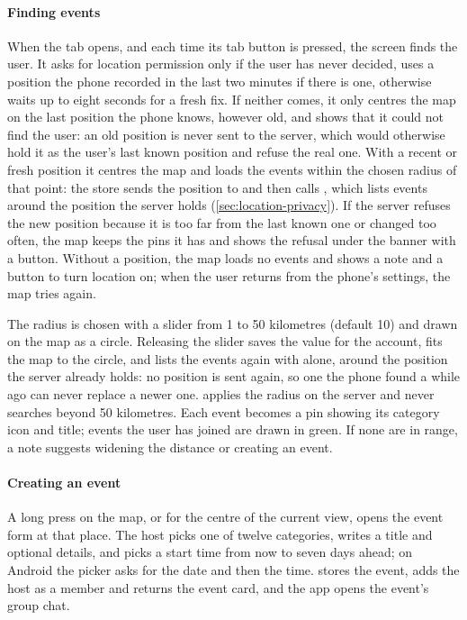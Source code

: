 \paragraph{Finding events} When the  tab opens, and each time its tab button is pressed, the
screen finds the user. It asks for location permission only if the user has never decided, uses a
position the phone recorded in the last two minutes if there is one, otherwise waits up to eight seconds
for a fresh fix. If neither comes, it only centres the map on the last position the phone knows, however
old, and shows that it could not find the user: an old position is never sent to the server, which would
otherwise hold it as the user's last known position and refuse the real one. With a recent or fresh
position it centres the map and loads the events within the chosen radius of that point: the store sends
the position to  and then calls , which lists events around the
position the server holds (\cref{sec:location-privacy}). If the server refuses the new position because it is too
far from the last known one or changed too often, the map keeps the pins it has and shows the refusal
under the banner with a  button. Without a position, the
map loads no events and shows a note and a button to turn location on; when the user returns from the
phone's settings, the map tries again.

The radius is chosen with a slider from 1 to 50 kilometres (default 10) and drawn on the map as a circle.
Releasing the slider saves the value for the account, fits the map to the circle, and lists the events
again with  alone, around the position the server already holds: no position is sent
again, so one the phone found a while ago can never replace a newer one.  applies the radius on the server and never searches beyond 50
kilometres. Each event becomes a pin showing its category icon and title; events the user has joined are
drawn in green. If none are in range, a note suggests widening the distance or creating an event.

\paragraph{Creating an event} A long press on the map, or  for the centre of the
current view, opens the event form at that place. The host picks one of twelve categories, writes a title
and optional details, and picks a start time from now to seven days ahead; on Android the picker asks for
the date and then the time.  stores the event, adds the host as a member and returns
the event card, and the app opens the event's group chat.

